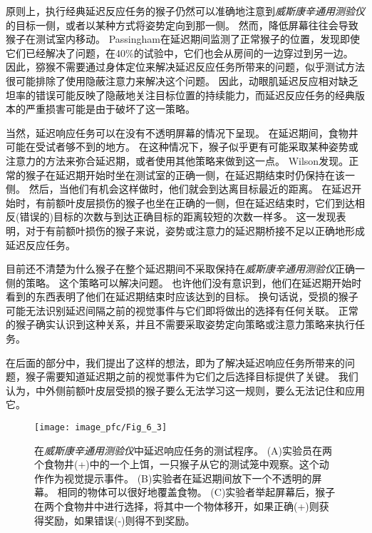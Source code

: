 原则上，执行经典延迟反应任务的猴子仍然可以准确地注意到\textit{威斯康辛通用测验仪}的目标一侧，或者以某种方式将姿势定向到那一侧。
然而，降低屏幕往往会导致猴子在测试室内移动。
Passingham\cite{passingham1971behavioural}在延迟期间监测了正常猴子的位置，发现即使它们已经解决了问题，在40\%的试验中，它们也会从房间的一边穿过到另一边。
因此，猕猴不需要通过身体定位来解决延迟反应任务所带来的问题，似乎测试方法很可能排除了使用隐蔽注意力来解决这个问题。
因此，动眼肌延迟反应相对缺乏坦率的错误可能反映了隐蔽地关注目标位置的持续能力，而延迟反应任务的经典版本的严重损害可能是由于破坏了这一策略。


当然，延迟响应任务可以在没有不透明屏幕的情况下呈现。
在延迟期间，食物井可能在受试者够不到的地方。
在这种情况下，猴子似乎更有可能采取某种姿势或注意力的方法来弥合延迟期，或者使用其他策略来做到这一点。
Wilson\cite{wilson1963effect}发现。正常的猴子在延迟期开始时坐在测试室的正确一侧，在延迟期结束时仍保持在该一侧。
然后，当他们有机会这样做时，他们就会到达离目标最近的距离。
在延迟开始时，有前额叶皮层损伤的猴子也坐在正确的一侧，但在延迟结束时，它们到达相反(错误的)目标的次数与到达正确目标的距离较短的次数一样多。
这一发现表明，对于有前额叶损伤的猴子来说，姿势或注意力的延迟期桥接不足以正确地形成延迟反应任务。


目前还不清楚为什么猴子在整个延迟期间不采取保持在\textit{威斯康辛通用测验仪}正确一侧的策略。
这个策略可以解决问题。
也许他们没有意识到，他们在延迟期开始时看到的东西表明了他们在延迟期结束时应该达到的目标。
换句话说，受损的猴子可能无法识别延迟间隔之前的视觉事件与它们即将做出的选择有任何关联。
正常的猴子确实认识到这种关系，并且不需要采取姿势定向策略或注意力策略来执行任务。


在后面的部分中，我们提出了这样的想法，即为了解决延迟响应任务所带来的问题，猴子需要知道延迟期之前的视觉事件为它们之后选择目标提供了关键。
我们认为，中外侧前额叶皮层受损的猴子要么无法学习这一规则，要么无法记住和应用它。


\begin{figure}
	\centering
	\texttt{[image: image\_pfc/Fig\_6\_3]}
	\caption{在\textit{威斯康辛通用测验仪}中延迟响应任务的测试程序。
		(A)实验员在两个食物井(+)中的一个上饵，一只猴子从它的测试笼中观察。这个动作作为视觉提示事件。
		(B)实验者在延迟期间放下一个不透明的屏幕。
		相同的物体可以很好地覆盖食物。
		(C)实验者举起屏幕后，猴子在两个食物井中进行选择，将其中一个物体移开，如果正确(+)则获得奖励，如果错误(-)则得不到奖励\cite{murray1991contributions}。}
	\label{fig:6_3}
\end{figure}




